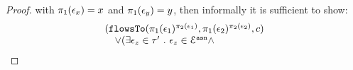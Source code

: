 \begin{proof}
with $\pi_1(\event_x) = x$ and $\pi_1(\event_y) = y$, then informally it is sufficient to show:
%
$$
\begin{array}{l}
(\flowsto(\pi_1(\event_1)^{\pi_2(\event_1)}, \pi_1(\event_2)^{\pi_2(\event_2)}, c)
\\ \quad 
\lor 
(\exists \event_z \in \trace' \st \event_z \in \eventset^{\asn} \land 

\end{array}$$
\end{proof}
